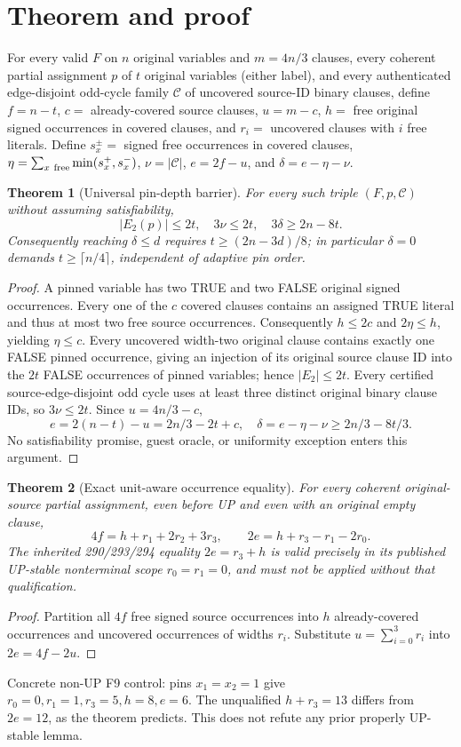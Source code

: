 \documentclass[11pt]{article}
\newtheorem{theorem}{Theorem}
\begin{document}
\section{Theorem and proof}
For every valid $F$ on $n$ original variables and $m=4n/3$ clauses, every coherent partial assignment $p$ of $t$ original variables (either label), and every authenticated edge-disjoint odd-cycle family $\mathcal C$ of uncovered source-ID binary clauses, define $f=n-t$, $c=$ already-covered source clauses, $u=m-c$, $h=$ free original signed occurrences in covered clauses, and $r_i=$ uncovered clauses with $i$ free literals. Define $s_x^\pm=$ signed free occurrences in covered clauses, $\eta=\sum_{x\ {\rm free}}\min(s_x^+,s_x^-)$, $\nu=|\mathcal C|$, $e=2f-u$, and $\delta=e-\eta-\nu$.
\begin{theorem}[Universal pin-depth barrier]
For every such triple $(F,p,\mathcal C)$ without assuming satisfiability,
\[
\boxed{|E_2(p)|\le2t,\quad 3\nu\le2t,\quad 3\delta\ge2n-8t.}
\]
Consequently reaching $\delta\le d$ requires $t\ge(2n-3d)/8$; in particular $\delta=0$ demands $t\ge\lceil n/4\rceil$, independent of adaptive pin order.
\end{theorem}
\begin{proof}
A pinned variable has two TRUE and two FALSE original signed occurrences. Every one of the $c$ covered clauses contains an assigned TRUE literal and thus at most two free source occurrences. Consequently $h\le2c$ and $2\eta\le h$, yielding $\eta\le c$. Every uncovered width-two original clause contains exactly one FALSE pinned occurrence, giving an injection of its original source clause ID into the $2t$ FALSE occurrences of pinned variables; hence $|E_2|\le2t$. Every certified source-edge-disjoint odd cycle uses at least three distinct original binary clause IDs, so $3\nu\le2t$. Since $u=4n/3-c$,
\[
e=2(n-t)-u=2n/3-2t+c,
\quad \delta=e-\eta-\nu\ge2n/3-8t/3.
\]
No satisfiability promise, guest oracle, or uniformity exception enters this argument.
\end{proof}
\begin{theorem}[Exact unit-aware occurrence equality]
For every coherent original-source partial assignment, even before UP and even with an original empty clause,
\[
\boxed{4f=h+r_1+2r_2+3r_3,\qquad
2e=h+r_3-r_1-2r_0.}
\]
The inherited 290/293/294 equality $2e=r_3+h$ is valid precisely in its published UP-stable nonterminal scope $r_0=r_1=0$, and must not be applied without that qualification.
\end{theorem}
\begin{proof}Partition all $4f$ free signed source occurrences into $h$ already-covered occurrences and uncovered occurrences of widths $r_i$. Substitute $u=\sum_{i=0}^3r_i$ into $2e=4f-2u$.\end{proof}
Concrete non-UP F9 control: pins $x_1=x_2=1$ give $r_0=0,r_1=1,r_3=5,h=8,e=6$. The unqualified $h+r_3=13$ differs from $2e=12$, as the theorem predicts. This does not refute any prior properly UP-stable lemma.
\end{document}
